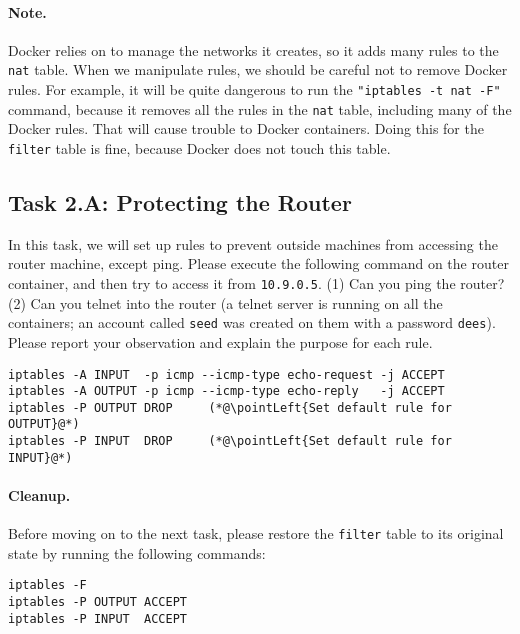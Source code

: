 \paragraph{Note.} Docker relies on \iptables to manage 
the networks it creates, so it adds many rules to 
the \texttt{nat} table. 
When we manipulate \iptables rules, we should be careful 
not to remove Docker rules. For example, it will be quite
dangerous to run the \texttt{"iptables -t nat -F"} command, because 
it removes all the rules in the \texttt{nat} table,
including many of the Docker rules. That will cause 
trouble to Docker containers. Doing this for 
the \texttt{filter} table is fine, because Docker 
does not touch this table. 


\subsection{Task 2.A: Protecting the Router} 

In this task, we will set up rules to prevent outside machines from 
accessing the router machine, except ping.   
Please execute the following \iptables
command on the router container, and then try to 
access it from \texttt{10.9.0.5}. (1) Can you ping 
the router? (2) Can you telnet into the router (a 
telnet server is running on all the containers; an
account called \texttt{seed} was created on them with
a password \texttt{dees}). 
Please report your observation and explain the purpose for 
each rule. 

\begin{lstlisting}
iptables -A INPUT  -p icmp --icmp-type echo-request -j ACCEPT
iptables -A OUTPUT -p icmp --icmp-type echo-reply   -j ACCEPT
iptables -P OUTPUT DROP     (*@\pointLeft{Set default rule for OUTPUT}@*)
iptables -P INPUT  DROP     (*@\pointLeft{Set default rule for INPUT}@*)
\end{lstlisting}
 

\paragraph{Cleanup.} 
Before moving on to the next task, please restore the \texttt{filter} 
table to its original state by running the following commands:

\begin{lstlisting}
iptables -F
iptables -P OUTPUT ACCEPT
iptables -P INPUT  ACCEPT
\end{lstlisting}
 

